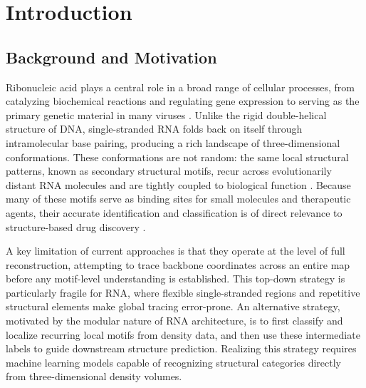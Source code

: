 \documentclass[sigconf]{acmart}
\begin{document}



\maketitle
\section{Introduction}
 
\subsection{Background and Motivation}
 
Ribonucleic acid plays a central role in a broad range of cellular
processes, from catalyzing biochemical reactions and regulating gene
expression to serving as the primary genetic material in many viruses
\cite{tinoco1999}. Unlike the rigid double-helical structure
of DNA, single-stranded RNA folds back on itself through intramolecular
base pairing, producing a rich landscape of three-dimensional
conformations. These conformations are not random: the same local
structural patterns, known as secondary structural motifs, recur
across evolutionarily distant RNA molecules and are tightly coupled
to biological function \cite{leontis2001}. Because many of these
motifs serve as binding sites for small molecules and therapeutic
agents, their accurate identification and classification is of direct
relevance to structure-based drug discovery \cite{porter2017}.

A key limitation of current approaches is that they operate at the
level of full reconstruction, attempting to trace backbone
coordinates across an entire map before any motif-level understanding
is established. This top-down strategy is particularly fragile for RNA,
where flexible single-stranded regions and repetitive structural elements
make global tracing error-prone. An alternative strategy, motivated by
the modular nature of RNA architecture, is to first classify and localize
recurring local motifs from density data, and then use these intermediate
labels to guide downstream structure prediction. Realizing this strategy
requires machine learning models capable of recognizing
structural categories directly from three-dimensional density volumes.
\end{document}
